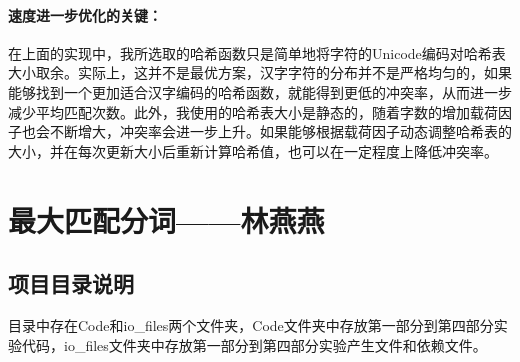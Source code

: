 \documentclass[11pt,a4paper]{article}
\begin{document}
	\paragraph{速度进一步优化的关键：}在上面的实现中，我所选取的哈希函数只是简单地将字符的Unicode编码对哈希表大小取余。实际上，这并不是最优方案，汉字字符的分布并不是严格均匀的，如果能够找到一个更加适合汉字编码的哈希函数，就能得到更低的冲突率，从而进一步减少平均匹配次数。此外，我使用的哈希表大小是静态的，随着字数的增加载荷因子也会不断增大，冲突率会进一步上升。如果能够根据载荷因子动态调整哈希表的大小，并在每次更新大小后重新计算哈希值，也可以在一定程度上降低冲突率。
	
	
	\section{最大匹配分词——林燕燕}
	
	\subsection{项目目录说明}
	目录中存在Code和io\_files两个文件夹，Code文件夹中存放第一部分到第四部分实验代码，io\_files文件夹中存放第一部分到第四部分实验产生文件和依赖文件。
	
\end{document}
